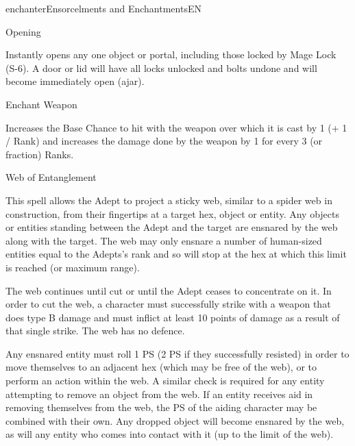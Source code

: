 \begin{college}[1.1]{enchanter}{Ensorcelments and Enchantments}{EN}
\begin{spell}[S-3]{Opening}

\begin{effects}
Instantly opens any one object or portal, including those locked by
Mage Lock (S-6).  A door or lid will have all locks unlocked and bolts
undone and will become immediately open (ajar).
\end{effects}
\end{spell}

\begin{spell}[S-4]{Enchant Weapon}

\begin{effects}
Increases the Base Chance to hit with the weapon over which it is cast
by 1 (+ 1 / Rank) and increases the damage done by the weapon by 1 for
every 3 (or fraction) Ranks.
\end{effects}
\end{spell}

\begin{spell}[S-5]{Web of Entanglement}

\begin{effects}
This spell allows the Adept to project a sticky web, similar to a
spider web in construction, from their fingertips at a target hex,
object or entity. Any objects or entities standing between the Adept
and the target are ensnared by the web along with the target. The web
may only ensnare a number of human-sized entities equal to the
Adepts's rank and so will stop at the hex at which this limit is
reached (or maximum range).

The web continues until cut or until the Adept ceases to concentrate
on it. In order to cut the web, a character must successfully strike
with a weapon that does type B damage and must inflict at least 10
points of damage as a result of that single strike.  The web has no
defence.

Any ensnared entity must roll 1 \x PS (2 \x PS if they successfully
resisted) in order to move themselves to an adjacent hex (which may be
free of the web), or to perform an action within the web. A similar
check is required for any entity attempting to remove an object from
the web. If an entity receives aid in removing themselves from the
web, the PS of the aiding character may be combined with their
own. Any dropped object will become ensnared by the web, as will any
entity who comes into contact with it (up to the limit of the web).
\end{effects}
\end{spell}


\end{college}
